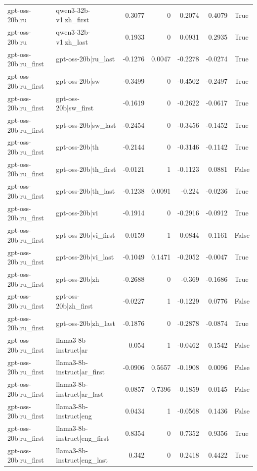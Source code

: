 \begin{table}
\begin{tabular}{l l r r r r l}
gpt-oss-20b|ru & qwen3-32b-v1|zh_first & 0.3077 & 0 & 0.2074 & 0.4079 & True \\
gpt-oss-20b|ru & qwen3-32b-v1|zh_last & 0.1933 & 0 & 0.0931 & 0.2935 & True \\
gpt-oss-20b|ru_first & gpt-oss-20b|ru_last & -0.1276 & 0.0047 & -0.2278 & -0.0274 & True \\
gpt-oss-20b|ru_first & gpt-oss-20b|sw & -0.3499 & 0 & -0.4502 & -0.2497 & True \\
gpt-oss-20b|ru_first & gpt-oss-20b|sw_first & -0.1619 & 0 & -0.2622 & -0.0617 & True \\
gpt-oss-20b|ru_first & gpt-oss-20b|sw_last & -0.2454 & 0 & -0.3456 & -0.1452 & True \\
gpt-oss-20b|ru_first & gpt-oss-20b|th & -0.2144 & 0 & -0.3146 & -0.1142 & True \\
gpt-oss-20b|ru_first & gpt-oss-20b|th_first & -0.0121 & 1 & -0.1123 & 0.0881 & False \\
gpt-oss-20b|ru_first & gpt-oss-20b|th_last & -0.1238 & 0.0091 & -0.224 & -0.0236 & True \\
gpt-oss-20b|ru_first & gpt-oss-20b|vi & -0.1914 & 0 & -0.2916 & -0.0912 & True \\
gpt-oss-20b|ru_first & gpt-oss-20b|vi_first & 0.0159 & 1 & -0.0844 & 0.1161 & False \\
gpt-oss-20b|ru_first & gpt-oss-20b|vi_last & -0.1049 & 0.1471 & -0.2052 & -0.0047 & True \\
gpt-oss-20b|ru_first & gpt-oss-20b|zh & -0.2688 & 0 & -0.369 & -0.1686 & True \\
gpt-oss-20b|ru_first & gpt-oss-20b|zh_first & -0.0227 & 1 & -0.1229 & 0.0776 & False \\
gpt-oss-20b|ru_first & gpt-oss-20b|zh_last & -0.1876 & 0 & -0.2878 & -0.0874 & True \\
gpt-oss-20b|ru_first & llama3-8b-instruct|ar & 0.054 & 1 & -0.0462 & 0.1542 & False \\
gpt-oss-20b|ru_first & llama3-8b-instruct|ar_first & -0.0906 & 0.5657 & -0.1908 & 0.0096 & False \\
gpt-oss-20b|ru_first & llama3-8b-instruct|ar_last & -0.0857 & 0.7396 & -0.1859 & 0.0145 & False \\
gpt-oss-20b|ru_first & llama3-8b-instruct|eng & 0.0434 & 1 & -0.0568 & 0.1436 & False \\
gpt-oss-20b|ru_first & llama3-8b-instruct|eng_first & 0.8354 & 0 & 0.7352 & 0.9356 & True \\
gpt-oss-20b|ru_first & llama3-8b-instruct|eng_last & 0.342 & 0 & 0.2418 & 0.4422 & True \\

\end{tabular}
\end{table}
